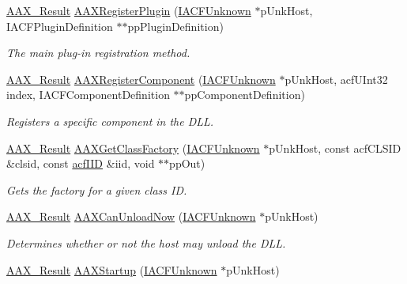 \begin{DoxyCompactItemize}
\item 
\mbox{\hyperlink{a00392_a4d8f69a697df7f70c3a8e9b8ee130d2f}{A\+A\+X\+\_\+\+Result}} \mbox{\hyperlink{a00796_ga83d05333118598c179ca6d89487fa203}{A\+A\+X\+Register\+Plugin}} (\mbox{\hyperlink{a01409}{I\+A\+C\+F\+Unknown}} $\ast$p\+Unk\+Host, I\+A\+C\+F\+Plugin\+Definition $\ast$$\ast$pp\+Plugin\+Definition)
\begin{DoxyCompactList}\small\item\em The main plug-\/in registration method. \end{DoxyCompactList}\item 
\mbox{\hyperlink{a00392_a4d8f69a697df7f70c3a8e9b8ee130d2f}{A\+A\+X\+\_\+\+Result}} \mbox{\hyperlink{a00617_a03c71f96fcf624bf50b7acbe31a846f0}{A\+A\+X\+Register\+Component}} (\mbox{\hyperlink{a01409}{I\+A\+C\+F\+Unknown}} $\ast$p\+Unk\+Host, acf\+U\+Int32 index, I\+A\+C\+F\+Component\+Definition $\ast$$\ast$pp\+Component\+Definition)
\begin{DoxyCompactList}\small\item\em Registers a specific component in the D\+LL. \end{DoxyCompactList}\item 
\mbox{\hyperlink{a00392_a4d8f69a697df7f70c3a8e9b8ee130d2f}{A\+A\+X\+\_\+\+Result}} \mbox{\hyperlink{a00617_a84cf37211a57dbaec9e7d077dd171798}{A\+A\+X\+Get\+Class\+Factory}} (\mbox{\hyperlink{a01409}{I\+A\+C\+F\+Unknown}} $\ast$p\+Unk\+Host, const acf\+C\+L\+S\+ID \&clsid, const \mbox{\hyperlink{a00269_a59df0b41744eee7a066787aaedf97f67}{acf\+I\+ID}} \&iid, void $\ast$$\ast$pp\+Out)
\begin{DoxyCompactList}\small\item\em Gets the factory for a given class ID. \end{DoxyCompactList}\item 
\mbox{\hyperlink{a00392_a4d8f69a697df7f70c3a8e9b8ee130d2f}{A\+A\+X\+\_\+\+Result}} \mbox{\hyperlink{a00617_a160de7bc2883da8ba24400933d814523}{A\+A\+X\+Can\+Unload\+Now}} (\mbox{\hyperlink{a01409}{I\+A\+C\+F\+Unknown}} $\ast$p\+Unk\+Host)
\begin{DoxyCompactList}\small\item\em Determines whether or not the host may unload the D\+LL. \end{DoxyCompactList}\item 
\mbox{\hyperlink{a00392_a4d8f69a697df7f70c3a8e9b8ee130d2f}{A\+A\+X\+\_\+\+Result}} \mbox{\hyperlink{a00617_a0d9b6aed98567dfb34a38b69432b564d}{A\+A\+X\+Startup}} (\mbox{\hyperlink{a01409}{I\+A\+C\+F\+Unknown}} $\ast$p\+Unk\+Host)
$$
\end{DoxyCompactItemize}
